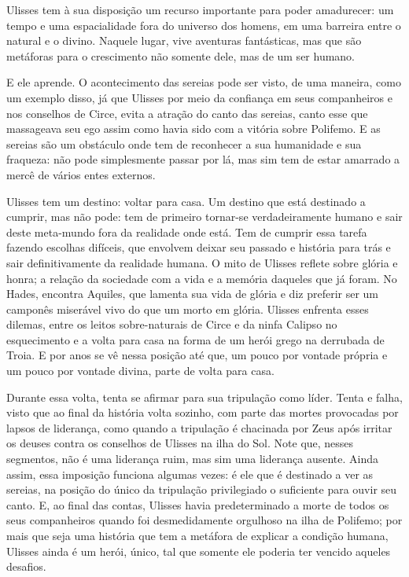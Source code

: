 \documentclass[12pt]{article}
\begin{document}
Ulisses tem à sua disposição um recurso importante para poder amadurecer: um tempo e uma espacialidade fora do universo dos homens, em uma barreira entre o natural e o divino. Naquele lugar, vive aventuras fantásticas, mas que são metáforas para o crescimento não somente dele, mas de um ser humano.

E ele aprende. O acontecimento das sereias pode ser visto, de uma maneira, como um exemplo disso, já que Ulisses por meio da confiança em seus companheiros e nos conselhos de Circe, evita a atração do canto das sereias, canto esse que massageava seu ego assim como havia sido com a vitória sobre Polifemo. E as sereias são um obstáculo onde tem de reconhecer a sua humanidade e sua fraqueza: não pode simplesmente passar por lá, mas sim tem de estar amarrado a mercê de vários entes externos.

Ulisses tem um destino: voltar para casa. Um destino que está destinado a cumprir, mas não pode: tem de primeiro tornar-se verdadeiramente humano e sair deste meta-mundo fora da realidade onde está. Tem de cumprir essa tarefa fazendo escolhas difíceis, que envolvem deixar seu passado e história para trás e sair definitivamente da realidade humana. O mito de Ulisses reflete sobre glória e honra; a relação da sociedade com a vida e a memória daqueles que já foram. No Hades, encontra Aquiles, que lamenta sua vida de glória e diz preferir ser um camponês miserável vivo do que um morto em glória. Ulisses enfrenta esses dilemas, entre os leitos sobre-naturais de Circe e da ninfa Calipso no esquecimento e a volta para casa na forma de um herói grego na derrubada de Troia. E por anos se vê nessa posição até que, um pouco por vontade própria e um pouco por vontade divina, parte de volta para casa. 

Durante essa volta, tenta se afirmar para sua tripulação como líder. Tenta e falha, visto que ao final da história volta sozinho, com parte das mortes provocadas por lapsos de liderança, como quando a tripulação é chacinada por Zeus após irritar os deuses contra os conselhos de Ulisses na ilha do Sol. Note que, nesses segmentos, não é uma liderança ruim, mas sim uma liderança ausente. Ainda assim, essa imposição funciona algumas vezes: é ele que é destinado a ver as sereias, na posição do único da tripulação privilegiado o suficiente para ouvir seu canto. E, ao final das contas, Ulisses havia predeterminado a morte de todos os seus companheiros quando foi desmedidamente orgulhoso na ilha de Polifemo; por mais que seja uma história que tem a metáfora de explicar a condição humana, Ulisses ainda é um herói, único, tal que somente ele poderia ter vencido aqueles desafios.
\end{document}
